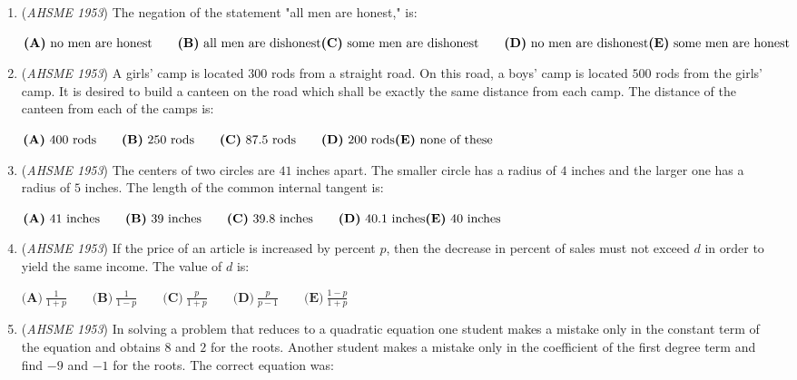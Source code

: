 \begin{enumerate}
 $\textbf{(A)}\ 1 \qquad \textbf{(B)}\ a \qquad \textbf{(C)}\ b \qquad \textbf{(D)}\ ab \qquad \textbf{(E)}\ \text{none of these}$


	\item (\textit{AHSME 1953}) The negation of the statement "all men are honest," is: 


 $\textbf{(A)}\ \text{no men are honest} \qquad \textbf{(B)}\ \text{all men are dishonest} \\  \textbf{(C)}\ \text{some men are dishonest}\qquad \textbf{(D)}\ \text{no men are dishonest}\\ \textbf{(E)}\ \text{some men are honest}$


	\item (\textit{AHSME 1953}) A girls' camp is located $300$ rods from a straight road. On this road, a boys' camp is located $500$ rods from the girls' camp. 
It is desired to build a canteen on the road which shall be exactly the same distance from each camp. 
The distance of the canteen from each of the camps is: 


 $\textbf{(A)}\ 400\text{ rods} \qquad \textbf{(B)}\ 250\text{ rods} \qquad \textbf{(C)}\ 87.5\text{ rods} \qquad \textbf{(D)}\ 200\text{ rods}\\ \textbf{(E)}\ \text{none of these}$


	\item (\textit{AHSME 1953}) The centers of two circles are $41$ inches apart. The smaller circle has a radius of $4$ inches and the larger one has a radius of $5$ inches. 
The length of the common internal tangent is: 


 $\textbf{(A)}\ 41\text{ inches} \qquad \textbf{(B)}\ 39\text{ inches} \qquad \textbf{(C)}\ 39.8\text{ inches} \qquad \textbf{(D)}\ 40.1\text{ inches}\\ \textbf{(E)}\ 40\text{ inches}$


	\item (\textit{AHSME 1953}) If the price of an article is increased by percent $p$, then the decrease in percent of sales must not exceed $d$ in order to yield the same income. 
The value of $d$ is: 


 $\textbf{(A)}\ \frac{1}{1+p} \qquad \textbf{(B)}\ \frac{1}{1-p} \qquad \textbf{(C)}\ \frac{p}{1+p} \qquad \textbf{(D)}\ \frac{p}{p-1}\qquad \textbf{(E)}\ \frac{1-p}{1+p}$


	\item (\textit{AHSME 1953}) In solving a problem that reduces to a quadratic equation one student makes a mistake only in the constant term of the equation and 
obtains $8$ and $2$ for the roots. Another student makes a mistake only in the coefficient of the first degree term and 
find $-9$ and $-1$ for the roots. The correct equation was: 



\end{enumerate}
